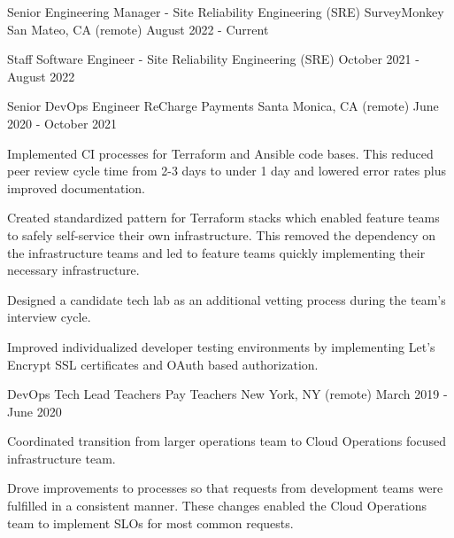 

\begin{cventries}

  \cventry
    {Senior Engineering Manager - Site Reliability Engineering (SRE)} %
    {SurveyMonkey} %
    {San Mateo, CA  (remote)} %
    {August 2022 - Current} %
    {}

  \cventry
    {Staff Software Engineer - Site Reliability Engineering (SRE)} %
    {} %
    {} %
    {October 2021 - August 2022} %
    {}

  \cventry
  {Senior DevOps Engineer} %
  {ReCharge Payments} %
  {Santa Monica, CA (remote)} %
  {June 2020 - October 2021} %
  { 
    \begin{cvitems} %
      \item {Implemented CI processes for Terraform and Ansible code bases. This reduced peer review cycle time from 2-3 days to under 1 day and lowered error rates plus improved documentation.}
      \item {Created standardized pattern for Terraform stacks which enabled feature teams to safely self-service their own infrastructure. This removed the dependency on the infrastructure teams and led to feature teams quickly implementing their necessary infrastructure.}
      \item {Designed a candidate tech lab as an additional vetting process during the team's interview cycle.}
      \item {Improved individualized developer testing environments by implementing Let's Encrypt SSL certificates and OAuth based authorization.}
    \end{cvitems}
  }

  \cventry
    {DevOps Tech Lead} %
    {Teachers Pay Teachers} %
    {New York, NY (remote)} %
    {March 2019 - June 2020} %
    {
      \begin{cvitems} %
        \item {Coordinated transition from larger operations team to Cloud Operations focused infrastructure team.}
        \item {Drove improvements to processes so that requests from development teams were fulfilled in a consistent manner. These changes enabled the Cloud Operations team to implement SLOs for most common requests.}
      \end{cvitems}
    }


\end{cventries}
